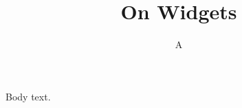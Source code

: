 \documentclass{tpcsname}
\begin{document}
\title{On Widgets}\author{A}
\maketitle
Body text.
\end{document}
